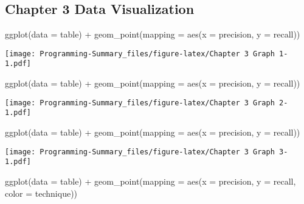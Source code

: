 \documentclass[
]{article}
\newenvironment{Shaded}{\begin{snugshade}}{\end{snugshade}}
\newcommand{\AttributeTok}[1]{\textcolor[rgb]{0.77,0.63,0.00}{#1}}
\newcommand{\FunctionTok}[1]{\textcolor[rgb]{0.00,0.00,0.00}{#1}}
\newcommand{\NormalTok}[1]{#1}
\newcommand{\SpecialCharTok}[1]{\textcolor[rgb]{0.00,0.00,0.00}{#1}}
\begin{document}
\hypertarget{chapter-3-data-visualization}{%
\subsection{Chapter 3 Data
Visualization}\label{chapter-3-data-visualization}}

\begin{Shaded}
\begin{Highlighting}[]
\FunctionTok{ggplot}\NormalTok{(}\AttributeTok{data =}\NormalTok{ table) }\SpecialCharTok{+} 
  \FunctionTok{geom\_point}\NormalTok{(}\AttributeTok{mapping =} \FunctionTok{aes}\NormalTok{(}\AttributeTok{x =}\NormalTok{ precision, }\AttributeTok{y =}\NormalTok{ recall))}
\end{Highlighting}
\end{Shaded}

\texttt{[image: Programming-Summary\_files/figure-latex/Chapter 3 Graph 1-1.pdf]}

\begin{Shaded}
\begin{Highlighting}[]
\FunctionTok{ggplot}\NormalTok{(}\AttributeTok{data =}\NormalTok{ table) }\SpecialCharTok{+} 
  \FunctionTok{geom\_point}\NormalTok{(}\AttributeTok{mapping =} \FunctionTok{aes}\NormalTok{(}\AttributeTok{x =}\NormalTok{ precision, }\AttributeTok{y =}\NormalTok{ recall))}
\end{Highlighting}
\end{Shaded}

\texttt{[image: Programming-Summary\_files/figure-latex/Chapter 3 Graph 2-1.pdf]}

\begin{Shaded}
\begin{Highlighting}[]
\FunctionTok{ggplot}\NormalTok{(}\AttributeTok{data =}\NormalTok{ table) }\SpecialCharTok{+} 
  \FunctionTok{geom\_point}\NormalTok{(}\AttributeTok{mapping =} \FunctionTok{aes}\NormalTok{(}\AttributeTok{x =}\NormalTok{ precision, }\AttributeTok{y =}\NormalTok{ recall))}
\end{Highlighting}
\end{Shaded}

\texttt{[image: Programming-Summary\_files/figure-latex/Chapter 3 Graph 3-1.pdf]}

\begin{Shaded}
\begin{Highlighting}[]
\FunctionTok{ggplot}\NormalTok{(}\AttributeTok{data =}\NormalTok{ table) }\SpecialCharTok{+} 
  \FunctionTok{geom\_point}\NormalTok{(}\AttributeTok{mapping =} \FunctionTok{aes}\NormalTok{(}\AttributeTok{x =}\NormalTok{ precision, }\AttributeTok{y =}\NormalTok{ recall, }\AttributeTok{color =}\NormalTok{ technique))}
\end{Highlighting}
\end{Shaded}
\end{document}

